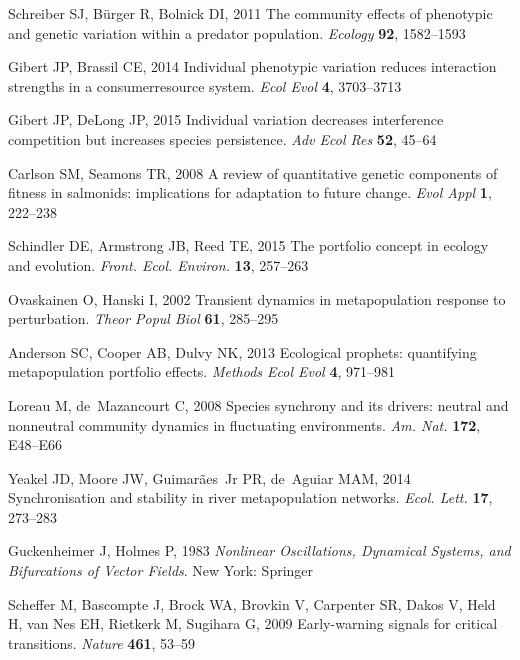 \documentclass{revtex4}
\begin{document}
\begin{thebibliography}{10}
Schreiber SJ, B{\"u}rger R, Bolnick DI, 2011 {The community effects of
  phenotypic and genetic variation within a predator population.}
\newblock \emph{Ecology} \textbf{92}, 1582--1593

Gibert JP, Brassil CE, 2014 {Individual phenotypic variation reduces
  interaction strengths in a consumer{\textendash}resource system}.
\newblock \emph{Ecol Evol} \textbf{4}, 3703--3713

Gibert JP, DeLong JP, 2015 {Individual variation decreases interference
  competition but increases species persistence}.
\newblock \emph{Adv Ecol Res} \textbf{52}, 45--64

Carlson SM, Seamons TR, 2008 {A review of quantitative genetic components of
  fitness in salmonids: implications for adaptation to future change}.
\newblock \emph{Evol Appl} \textbf{1}, 222--238

Schindler DE, Armstrong JB, Reed TE, 2015 {The portfolio concept in ecology and
  evolution}.
\newblock \emph{Front. Ecol. Environ.} \textbf{13}, 257--263

Ovaskainen O, Hanski I, 2002 {Transient dynamics in metapopulation response to
  perturbation}.
\newblock \emph{Theor Popul Biol} \textbf{61}, 285--295

Anderson SC, Cooper AB, Dulvy NK, 2013 {Ecological prophets: quantifying
  metapopulation portfolio effects}.
\newblock \emph{Methods Ecol Evol} \textbf{4}, 971--981

Loreau M, de~Mazancourt C, 2008 {Species synchrony and its drivers: neutral and
  nonneutral community dynamics in fluctuating environments}.
\newblock \emph{Am. Nat.} \textbf{172}, E48--E66

Yeakel JD, Moore JW, Guimar{\~a}es~Jr PR, de~Aguiar MAM, 2014 {Synchronisation
  and stability in river metapopulation networks}.
\newblock \emph{Ecol. Lett.} \textbf{17}, 273--283

Guckenheimer J, Holmes P, 1983 \emph{{Nonlinear Oscillations, Dynamical
  Systems, and Bifurcations of Vector Fields}}.
\newblock New York: Springer

Scheffer M, Bascompte J, Brock WA, Brovkin V, Carpenter SR, Dakos V, Held H,
  van Nes EH, Rietkerk M, Sugihara G, 2009 {Early-warning signals for critical
  transitions}.
\newblock \emph{Nature} \textbf{461}, 53--59


\end{thebibliography}
\end{document}
